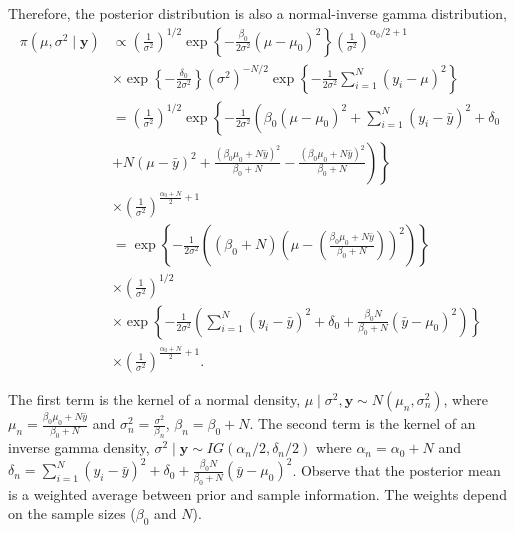 \begin{enumerate}
Therefore, the posterior distribution is also a normal-inverse gamma distribution,
\begin{align*}
	\pi(\mu,\sigma^2\mid \bm{y})&\propto \left(\frac{1}{\sigma^2}\right)^{1/2}\exp\left\{-\frac{\beta_0}{2\sigma^2}(\mu-\mu_0)^2\right\}\left(\frac{1}{\sigma^2}\right)^{\alpha_0/2+1}\\
	&\times\exp\left\{-\frac{\delta_0}{2\sigma^2}\right\}(\sigma^2)^{-N/2}\exp\left\{-\frac{1}{2\sigma^2}\sum_{i=1}^N (y_i-\mu)^2\right\}\\
	& = \left(\frac{1}{\sigma^2}\right)^{1/2}\exp\left\{-\frac{1}{2\sigma^2}\left(\beta_0(\mu-\mu_0)^2+\sum_{i=1}^N (y_i-\bar{y})^2+\delta_0\right.\right.\\
	& \left.\left.+N(\mu-\bar{y})^2+ \frac{(\beta_0\mu_0+N\bar{y})^2}{\beta_0+N} - \frac{(\beta_0\mu_0+N\bar{y})^2}{\beta_0+N}\right)\right\}\\
	&\times\left(\frac{1}{\sigma^2}\right)^{\frac{\alpha_0+N}{2}+1}\\
	& = \exp\left\{-\frac{1}{2\sigma^2}\left((\beta_0+N)\left(\mu-\left(\frac{\beta_0\mu_0+N\bar{y}}{\beta_0+N}\right)\right)^2\right)\right\}\\
	&\times \left(\frac{1}{\sigma^2}\right)^{1/2}\\
	& \times \exp\left\{-\frac{1}{2\sigma^2}\left(\sum_{i=1}^N (y_i-\bar{y})^2+\delta_0+\frac{\beta_0N}{\beta_0+N}(\bar{y}-\mu_0)^2\right)\right\}\\
	&\times \left(\frac{1}{\sigma^2}\right)^{\frac{\alpha_0+N}{2}+1}.
\end{align*}

The first term is the kernel of a normal density, $\mu\mid \sigma^2,\bm{y}\sim N \left(\mu_n, \sigma_n^2\right)$, where $\mu_n=\frac{\beta_0\mu_0+N\bar{y}}{\beta_0+N}$ and $\sigma_n^2=\frac{\sigma^2}{\beta_n}$, $\beta_n=\beta_0+N$. The second term is the kernel of an inverse gamma density, $\sigma^2\mid \bm{y}\sim IG(\alpha_n/2,\delta_n/2)$ where $\alpha_n=\alpha_0+N$ and $\delta_n=\sum_{i=1}^N (y_i-\bar{y})^2+\delta_0+\frac{\beta_0N}{\beta_0+N}(\bar{y}-\mu_0)^2$. Observe that the posterior mean is a weighted average between prior and sample information. The weights depend on the sample sizes ($\beta_0$ and $N$).


\end{enumerate}
